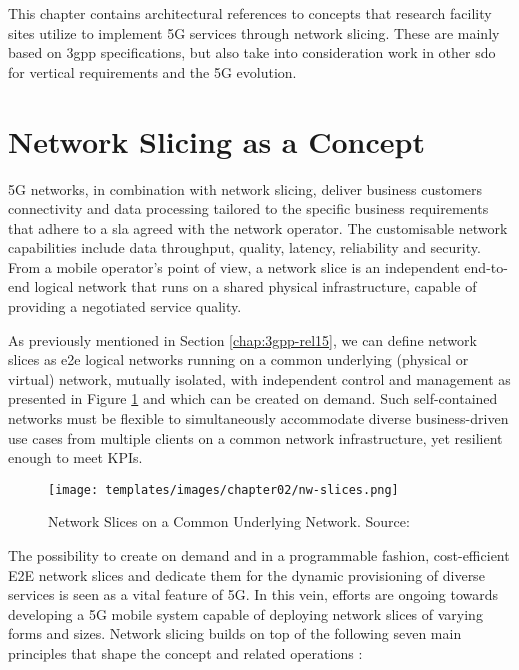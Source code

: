 
This chapter contains architectural references to concepts that research facility sites utilize to implement 5G services through network slicing. These are mainly based on \acrshort{3gpp} specifications, but also take into consideration work in other \acrshort{sdo} for vertical requirements and the 5G evolution.

\section{Network Slicing as a Concept}
5G networks, in combination with network slicing, deliver business customers connectivity and data processing tailored to the specific business requirements that adhere to a \acrfull{sla} agreed with the network operator. The customisable network capabilities include data throughput, quality, latency, reliability and security. From a mobile operator’s point of view, a network slice is an independent end-to-end logical network that runs on a shared physical infrastructure, capable of providing a negotiated service quality. 

As previously mentioned in Section  \ref{chap:3gpp-rel15}, we can define network slices as \acrshort{e2e} logical networks running on a common underlying (physical or virtual) network, mutually isolated, with independent control and management as presented in Figure \ref{fig:nw-slices} and which can be created on demand. Such self-contained networks must be flexible to simultaneously accommodate diverse business-driven use cases from multiple clients on a common network infrastructure, yet resilient enough to meet KPIs.

\begin{figure}[!ht]
    \centering
    \texttt{[image: templates/images/chapter02/nw-slices.png]}
    \caption{Network Slices on a Common Underlying Network. Source: \cite{OrdonezLucena2017NetworkSF}}
    \label{fig:nw-slices}
\end{figure}

The possibility to create on demand and in a programmable fashion, cost-efficient E2E network slices and dedicate them for the dynamic provisioning of diverse services is seen as a vital feature of 5G. In this vein, efforts are ongoing towards developing a 5G mobile system capable of deploying network slices of varying forms and sizes. Network slicing builds on top of the following seven main principles that shape the concept and related operations \cite{8320765}:


